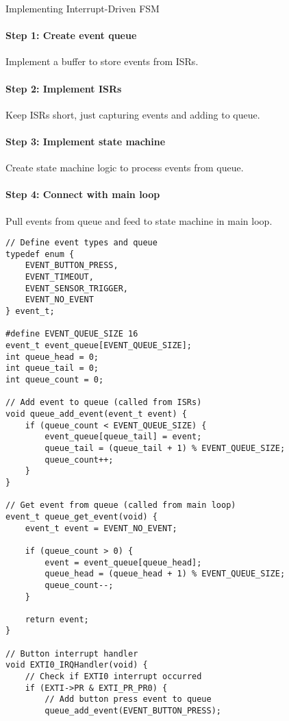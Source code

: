 \begin{KR}{Implementing Interrupt-Driven FSM}\\
\paragraph{Step 1: Create event queue}
Implement a buffer to store events from ISRs.
\paragraph{Step 2: Implement ISRs}
Keep ISRs short, just capturing events and adding to queue.
\paragraph{Step 3: Implement state machine}
Create state machine logic to process events from queue.
\paragraph{Step 4: Connect with main loop}
Pull events from queue and feed to state machine in main loop.

\begin{lstlisting}[style=basesmol]
// Define event types and queue
typedef enum {
    EVENT_BUTTON_PRESS,
    EVENT_TIMEOUT,
    EVENT_SENSOR_TRIGGER,
    EVENT_NO_EVENT
} event_t;

#define EVENT_QUEUE_SIZE 16
event_t event_queue[EVENT_QUEUE_SIZE];
int queue_head = 0;
int queue_tail = 0;
int queue_count = 0;

// Add event to queue (called from ISRs)
void queue_add_event(event_t event) {
    if (queue_count < EVENT_QUEUE_SIZE) {
        event_queue[queue_tail] = event;
        queue_tail = (queue_tail + 1) % EVENT_QUEUE_SIZE;
        queue_count++;
    }
}

// Get event from queue (called from main loop)
event_t queue_get_event(void) {
    event_t event = EVENT_NO_EVENT;
    
    if (queue_count > 0) {
        event = event_queue[queue_head];
        queue_head = (queue_head + 1) % EVENT_QUEUE_SIZE;
        queue_count--;
    }
    
    return event;
}

// Button interrupt handler
void EXTI0_IRQHandler(void) {
    // Check if EXTI0 interrupt occurred
    if (EXTI->PR & EXTI_PR_PR0) {
        // Add button press event to queue
        queue_add_event(EVENT_BUTTON_PRESS);
        

\end{lstlisting}
\end{KR}
